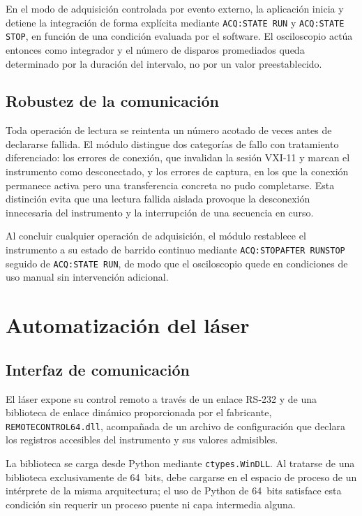 En el modo de adquisición controlada por evento externo, la
aplicación inicia y detiene la integración de forma explícita
mediante \texttt{ACQ:STATE RUN} y \texttt{ACQ:STATE STOP}, en función
de una condición evaluada por el software. El osciloscopio actúa
entonces como integrador y el número de disparos promediados queda
determinado por la duración del intervalo, no por un valor
preestablecido.

\subsection*{Robustez de la comunicación}

Toda operación de lectura se reintenta un número acotado de veces
antes de declararse fallida. El módulo distingue dos categorías de
fallo con tratamiento diferenciado: los errores de conexión, que
invalidan la sesión VXI-11 y marcan el instrumento como desconectado,
y los errores de captura, en los que la conexión permanece activa
pero una transferencia concreta no pudo completarse. Esta distinción
evita que una lectura fallida aislada provoque la desconexión
innecesaria del instrumento y la interrupción de una secuencia en
curso.

Al concluir cualquier operación de adquisición, el módulo restablece
el instrumento a su estado de barrido continuo mediante
\texttt{ACQ:STOPAFTER RUNSTOP} seguido de \texttt{ACQ:STATE RUN}, de
modo que el osciloscopio quede en condiciones de uso manual sin
intervención adicional.

\section{Automatización del láser}
\label{sec:auto_laser}

\subsection*{Interfaz de comunicación}

El láser expone su control remoto a través de un enlace RS-232 y de
una biblioteca de enlace dinámico proporcionada por el fabricante,
\texttt{REMOTECONTROL64.dll}, acompañada de un archivo de
configuración que declara los registros accesibles del instrumento y
sus valores admisibles.

La biblioteca se carga desde Python mediante \texttt{ctypes.WinDLL}.
Al tratarse de una biblioteca exclusivamente de \SI{64}{bits}, debe
cargarse en el espacio de proceso de un intérprete de la misma
arquitectura; el uso de Python de \SI{64}{bits} satisface esta
condición sin requerir un proceso puente ni capa intermedia alguna.

